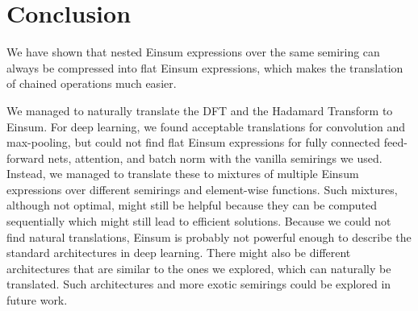 \chapter{Conclusion}


We have shown that nested Einsum expressions over the same semiring can always be compressed into flat Einsum expressions, which makes the translation of chained operations much easier.

We managed to naturally translate the DFT and the Hadamard Transform to Einsum.
For deep learning, we found acceptable translations for convolution and max-pooling,
but could not find flat Einsum expressions for fully connected feed-forward nets, attention, and batch norm with the vanilla semirings we used.
Instead, we managed to translate these to mixtures of multiple Einsum expressions over different semirings and element-wise functions.
Such mixtures, although not optimal, might still be helpful because they can be computed sequentially which might still lead to efficient solutions.
Because we could not find natural translations, Einsum is probably not powerful enough to describe the standard architectures in deep learning.
There might also be different architectures that are similar to the ones we explored, which can naturally be translated.
Such architectures and more exotic semirings could be explored in future work.
